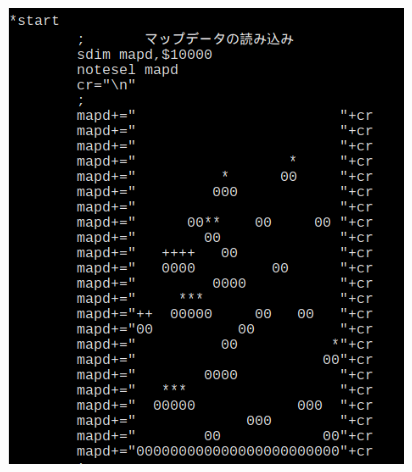 \documentclass[a4paper,dvipdfmx]{jarticle}
\begin{document}
\begin{center}
\includegraphics[width=10.478cm,height=12.07cm]{text04-img/text04-img025.png}

\end{center}

\bigskip


\bigskip


\bigskip


\bigskip


\bigskip


\bigskip


\bigskip


\bigskip


\bigskip


\bigskip


\bigskip


\bigskip


\bigskip


\bigskip


\bigskip


\bigskip


\bigskip


\bigskip


\bigskip


\bigskip


\bigskip


\bigskip


\bigskip


\bigskip
\end{document}
